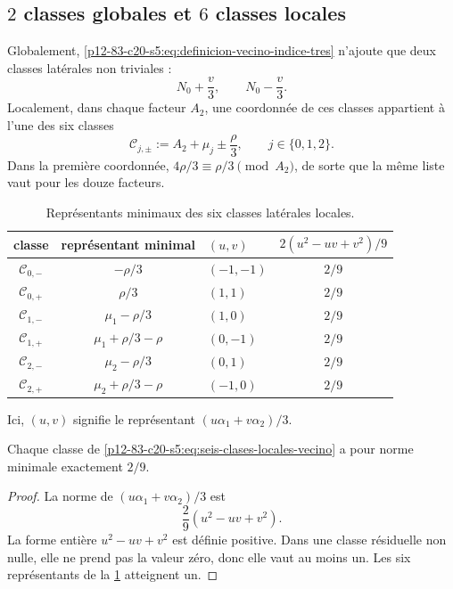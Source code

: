 \subsection{\(2\) classes globales et \(6\) classes locales}

Globalement, \eqref{p12-83-c20-s5:eq:definicion-vecino-indice-tres} n'ajoute que deux classes
latérales non triviales :
\[
 N_0+\frac v3,
 \qquad
 N_0-\frac v3.
\]
Localement, dans chaque facteur \(A_2\), une coordonnée de ces classes appartient
à l'une des six classes
\begin{equation}
 \mathscr C_{j,\pm}
 :=A_2+\mu_j\pm\frac\rho3,
 \qquad j\in\{0,1,2\}.
 \label{p12-83-c20-s5:eq:seis-clases-locales-vecino}
\end{equation}
Dans la première coordonnée, \(4\rho/3\equiv\rho/3\pmod{A_2}\), de sorte que
la même liste vaut pour les douze facteurs.

\begin{table}[htbp]
\centering
\caption{Représentants minimaux des six classes latérales locales.}
\label{p12-83-c20-s5:tab:seis-clases-locales-vecino}
\begin{tabular}{cclc}
\toprule
classe&représentant minimal&\((u,v)\)&
\(2(u^2-uv+v^2)/9\)\\
\midrule
\(\mathscr C_{0,-}\)&\(-\rho/3\)&\((-1,-1)\)&\(2/9\)\\
\(\mathscr C_{0,+}\)&\( \rho/3\)&\((1,1)\)&\(2/9\)\\
\(\mathscr C_{1,-}\)&\( \mu_1-\rho/3\)&\((1,0)\)&\(2/9\)\\
\(\mathscr C_{1,+}\)&\( \mu_1+\rho/3-\rho\)&\((0,-1)\)&\(2/9\)\\
\(\mathscr C_{2,-}\)&\( \mu_2-\rho/3\)&\((0,1)\)&\(2/9\)\\
\(\mathscr C_{2,+}\)&\( \mu_2+\rho/3-\rho\)&\((-1,0)\)&\(2/9\)\\
\bottomrule
\end{tabular}
\end{table}

Ici, \((u,v)\) signifie le représentant
\((u\alpha_1+v\alpha_2)/3\).

\begin{lemma}
\label{p12-83-c20-s5:lem:minimo-seis-clases-locales}
Chaque classe de \eqref{p12-83-c20-s5:eq:seis-clases-locales-vecino} a pour norme minimale
exactement \(2/9\).
\end{lemma}

\begin{proof}
La norme de \((u\alpha_1+v\alpha_2)/3\) est
\[
 \frac29(u^2-uv+v^2).
\]
La forme entière \(u^2-uv+v^2\) est définie positive. Dans une classe résiduelle
non nulle, elle ne prend pas la valeur zéro, donc elle vaut au moins un. Les six
représentants de la \cref{p12-83-c20-s5:tab:seis-clases-locales-vecino} atteignent un.
\end{proof}

